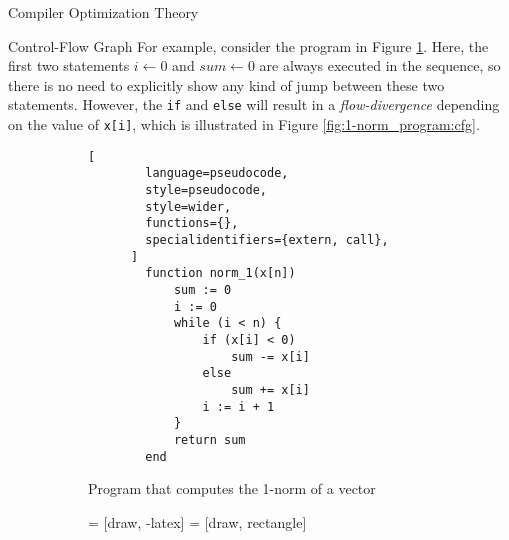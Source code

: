 \begin{section}{Compiler Optimization Theory}
\begin{subsection}{Control-Flow Graph}
For example, consider the program in Figure \ref{fig:1-norm_program}.  Here,
the first two statements $i \leftarrow 0$ and $\textit{sum} \leftarrow 0$ are
always executed in the sequence, so there is no need to explicitly show any
kind of jump between these two statements. However, the \texttt{if} and
\texttt{else} will result in a \textit{flow-divergence} depending on the value
of \texttt{x[i]}, which is illustrated in Figure \ref{fig:1-norm_program:cfg}. 
\begin{figure}[ht]
\centering
  \begin{subfigure}[b]{0.40\textwidth}
      \begin{lstlisting}[
        language=pseudocode,
        style=pseudocode,
        style=wider,
        functions={},
        specialidentifiers={extern, call},
      ]
        function norm_1(x[n])
            sum := 0
			i := 0
            while (i < n) {
                if (x[i] < 0)
                    sum -= x[i]
                else
                    sum += x[i]
				i := i + 1
            }
            return sum
        end
      \end{lstlisting}
	  \caption{Program that computes the 1-norm of a vector}
	  \label{fig:1-norm_program}
  \end{subfigure}
  \begin{subfigure}[b]{0.40\textwidth}
     = [draw, -latex]
     = [draw, rectangle]
    \begin{center}
\end{center}
\end{subfigure}
\end{figure}
\end{subsection}
\end{section}
